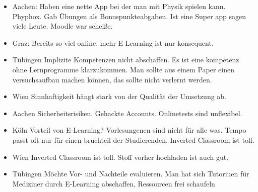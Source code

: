 	\begin{itemize}
		\item Aachen: Haben eine nette App bei der man mit Physik spielen kann. Phyphox. Gab Übungen als Bonuspunkteabgaben. Ist eine Super app sagen viele Leute. Moodle war scheiße.
		\item Graz: Bereits so viel online, mehr E-Learning ist nur konsequent.
		\item Tübingen
		Implizite Kompetenzen nicht abschaffen. Es ist eine kompetenz ohne Lernprogramme klarzukommen. Man sollte aus einem Paper einen versuchsaufbau machen können, das sollte nicht verlernt werden.

		\item Wien
		Sinnhaftigkeit hängt stark von der Qualität der Umsetzung ab.

		\item Aachen
		Sicherheitsrisiken. Gehackte Accounts. Onlinetests sind unflexibel.

		\item Köln
		Vorteil von E-Learning?
		Vorlesungenen sind nicht für alle was. Tempo passt oft nur für einen bruchteil der Studierenden.
		Inverted Classroom ist toll.

		\item Wien
		Inverted Classroom ist toll. Stoff vorher hochladen ist auch gut.

		\item Tübingen
		Möchte Vor- und Nachteile evaluieren. Man hat sich Tutoriuen für Mediziner durch E-Learning abschaffen, Ressourcen frei schaufeln
	\end{itemize}

